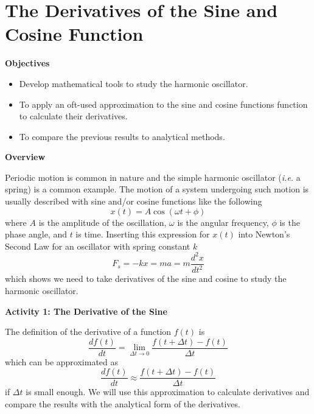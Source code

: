 
\section{The Derivatives of the Sine and Cosine Function}

\makelabheader %

\medskip
\textbf{Objectives }

\begin{itemize}[nosep]
\item Develop mathematical tools to study the harmonic oscillator.
\item To apply an oft-used approximation to the sine and cosine functions function to calculate their derivatives.
\item To compare the previous results to analytical methods.
\end{itemize}
\textbf{Overview }

Periodic motion is common in nature and the simple harmonic oscillator ({\it i.e.} a spring) is
a common example.
The motion of a system undergoing such motion is usually described with sine
and/or cosine functions like the following
\begin{equation}
x(t) = A\cos(\omega t + \phi)
\end{equation}
where $A$ is the amplitude of the oscillation, $\omega$ is the angular frequency, $\phi$ is the
phase angle, and $t$ is time.
Inserting this expression for $x(t)$ into Newton's Second Law for an oscillator
with spring constant $k$
\begin{equation}
F_s = -kx = ma = m\frac{d^2x}{dt^2}
\end{equation}
which shows we need to take derivatives of the sine and cosine to study the harmonic oscillator.

\textbf{Activity 1: The Derivative of the Sine} 

The definition of the derivative of a function $f(t)$ is 
\begin{equation}
\frac{d f(t)}{dt} = \lim_{\Delta t \rightarrow 0} \frac{f(t+\Delta t) - f(t)}{\Delta t}
\end{equation}
which can be approximated as
\begin{equation}
\frac{d f(t)}{dt} \approx \frac{f(t+\Delta t) - f(t)}{\Delta t}
\end{equation}\label{eq:approx}
if $\Delta t$ is small enough.
We will use this approximation to calculate derivatives and compare the results
with the analytical form of the derivatives.

